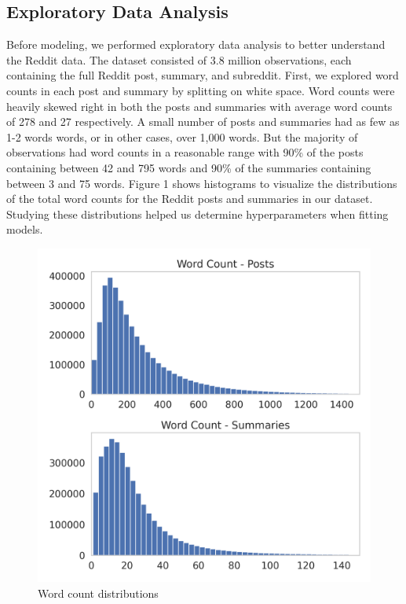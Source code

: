 \documentclass[11pt,a4paper, twocolumn]{article}
\begin{document}
\subsection{Exploratory Data Analysis}

Before modeling, we performed exploratory data analysis to better understand the Reddit data. 
The dataset consisted of 3.8 million observations, each containing the full Reddit post, summary, and subreddit. 
First, we explored word counts in each post and summary by splitting on white space. 
Word counts were heavily skewed right in both the posts and summaries with average word counts of 278 and 27 respectively. 
A small number of posts and summaries had as few as 1-2 words words, or in other cases, over 1,000 words. 
But the majority of observations had word counts in a reasonable range with 90\% of the posts containing between 42 and 795 words
and 90\% of the summaries containing between 3 and 75 words. 
Figure 1 shows histograms to visualize the distributions of the total word counts for the Reddit posts and summaries in our dataset. 
Studying these distributions helped us determine hyperparameters when fitting models.

\begin{figure}[h]
  \includegraphics[width=.95\linewidth]{word_counts.png}
  \caption{Word count distributions}
  \label{fig:word_counts}
\end{figure}
\end{document}
